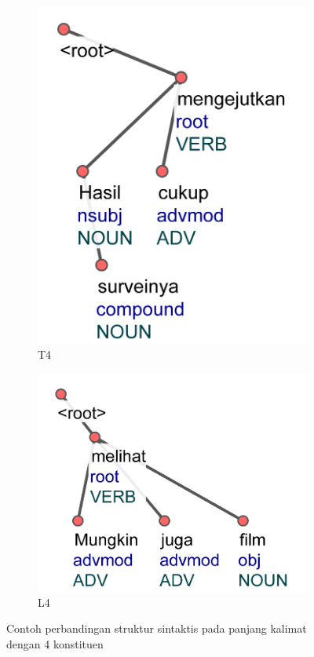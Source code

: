 \begin{figure}
\centering

\begin{subfigure}{.3\linewidth}
  \centering
  \includegraphics[width=1\linewidth] {pics/ts662.jpg} 
	\caption{T4}
	\label{fig:ts662} 
\end{subfigure}
%
\begin{subfigure}{.35\linewidth}
  \centering
  \includegraphics[width=1\linewidth]{pics/ls1102.jpg} 
	\caption{L4}
	\label{fig:ls1102} 
\end{subfigure}

\caption{Contoh perbandingan struktur sintaktis pada panjang kalimat dengan 4 konstituen}
\label{fig:struktur4}
\end{figure}

